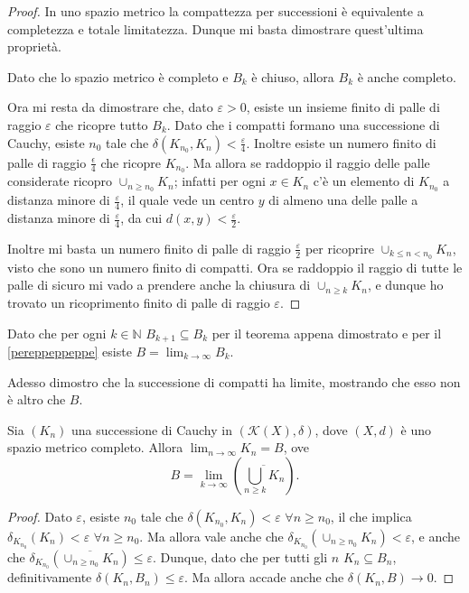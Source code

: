 \begin{proof}
In uno spazio metrico la compattezza per successioni è equivalente a completezza e totale limitatezza. Dunque mi basta dimostrare quest'ultima proprietà. 

Dato che lo spazio metrico è completo e $B_k$ è chiuso, allora $B_k$ è anche completo.

Ora mi resta da dimostrare che, dato $\varepsilon>0$, esiste un insieme finito di palle di raggio $\varepsilon$ che ricopre tutto $B_k$. Dato che i compatti formano una successione di Cauchy, esiste $n_0$ tale che $\delta\left (K_{n_0}, K_n\right )< \frac{\varepsilon}{4}$. Inoltre esiste un numero finito di palle di raggio $\frac{\epsilon}{4}$ che ricopre $K_{n_0}$. Ma allora se raddoppio il raggio delle palle considerate ricopro $\cup_{n\geq n_0} K_n$; infatti per ogni $x \in K_n$ c'è un elemento di $K_{n_0}$ a distanza minore di $\frac{\varepsilon}{4}$, il quale vede un centro $y$ di almeno una delle palle a distanza minore di $\frac{\varepsilon}{4}$, da cui $d(x,y)<\frac{\varepsilon}{2}$.

Inoltre mi basta un numero finito di palle di raggio $\frac{\varepsilon}{2}$ per ricoprire $\cup_{k \leq n< n_0} K_n$, visto che sono un numero finito di compatti. Ora se raddoppio il raggio di tutte le palle di sicuro mi vado a prendere anche la chiusura di $\cup_{n\geq k} K_n$, e dunque ho trovato un ricoprimento finito di palle di raggio $\varepsilon$.
\end{proof}

Dato che per ogni $k\in \mathbb{N}$ $B_{k+1}\subseteq B_k$ per il teorema appena dimostrato e per il \cref{pereppeppeppe} esiste $B=\lim_{k \to \infty} B_k$.

Adesso dimostro che la successione di compatti ha limite, mostrando che esso non è altro che $B$.

\begin{theorem}
Sia $\left (K_n\right )$ una successione di Cauchy in $\left (\mathcal{K}(X),\delta \right ) $, dove $\left (X, d\right )$ è uno spazio metrico completo. Allora $\lim_{n \to \infty}K_n=B$, ove
\begin{equation*}
B=\lim_{k \to \infty} \left(\overline{\bigcup_{n\geq k} K_n} \right).
\end{equation*}
\end{theorem}

\begin{proof}
Dato $\varepsilon$, esiste $n_0$ tale che $\delta\left  (K_{n_0}, K_n\right )< \varepsilon$ $\forall n\geq n_0$, il che implica $\delta _{K_{n_0}}\left  (K_n\right )<\varepsilon$ $\forall n\geq n_0$. Ma allora vale anche che $\delta _{K_{n_0}}\left  (\cup_{n\geq n_0} K_n\right )<\varepsilon$, e anche che $\delta _{K_{n_0}}\left  (\overline {\cup_{n\geq n_0} K_n} \right ) \leq \varepsilon$. Dunque, dato che per tutti gli $n$ $K_n \subseteq B_n$,  definitivamente $\delta\left  (K_n, B_n\right ) \leq \varepsilon$. Ma allora accade anche che $\delta\left  (K_n, B\right ) \to 0$.
\end{proof}

